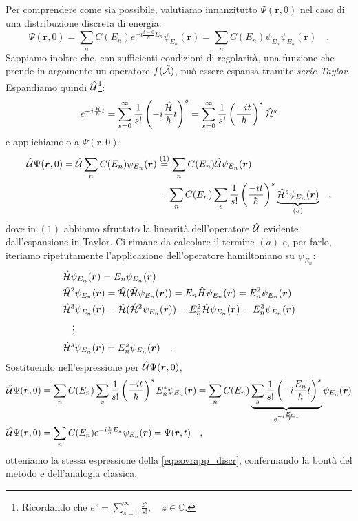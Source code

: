 Per comprendere come sia possibile, valutiamo innanzitutto $\Psi(\bm{r}, 0)$ nel caso di una distribuzione discreta di energia:
\[
    \Psi(\bm{r},0) = \sum_n C(E_n)e^{-i\frac{t = 0}{\hbar}E_n}\psi_{E_n}(\bm{r}) = \sum_n C(E_n)\psi_{E_n}\psi_{E_n}(\bm{r}) \quad.
\]
Sappiamo inoltre che, con sufficienti condizioni di regolarità, una funzione che prende in argomento un operatore $f(\hat{\mathcal{A}})$, può essere espansa tramite \emph{serie Taylor}. Espandiamo quindi $\hat{\mathcal{U}}$\footnote{Ricordando che $e^z = \sum_{s = 0}^{\infty} \frac{z^s}{s!}, \quad z \in \mathbb{C}$.}:
\[
    e^{-i\frac{\hat{\mathcal{H}}}{\hbar}t} = \sum_{s=0}^{\infty} \frac{1}{s!}\left(-i\frac{\hat{\mathcal{H}}}{\hbar}t\right)^s = \sum_{s=0}^{\infty} \frac{1}{s!}\left(\frac{-it}{\hbar}\right)^s \hat{\mathcal{H}}^s
\]
e applichiamolo a $\Psi(\bm{r},0)$:
\[
\begin{aligned}
    \hat{\mathcal{U}}\Psi(\bm{r},0) = \hat{\mathcal{U}}\sum_n C(E_n)\psi_{E_n}(\bm{r}) &\overset{(1)}{=} \sum_n C(E_n) \hat{\mathcal{U}} \psi_{E_n}(\bm{r}) \\
    &= \sum_n C(E_n) \sum_{s} \frac{1}{s!}\left(\frac{-it}{\hbar}\right)^s \underbrace{\hat{\mathcal{H}}^s \psi_{E_n}(\bm{r})}_{(a)} \quad,
\end{aligned}
\]
dove in $(1)$ abbiamo sfruttato la linearità dell'operatore $\hat{\mathcal{U}}$ evidente dall'espansione in Taylor. Ci rimane da calcolare il termine $(a)$ e, per farlo, iteriamo ripetutamente l'applicazione dell'operatore hamiltoniano su $\psi_{E_n}$:
\[
\begin{aligned}
    &\hat{\mathcal{H}}\psi_{E_n}(\bm{r}) = E_n\psi_{E_n}(\bm{r}) \\
    &\hat{\mathcal{H}}^2\psi_{E_n}(\bm{r}) = \hat{\mathcal{H}}(\hat{\mathcal{H}}\psi_{E_n}(\bm{r})) = E_n\hat{H}\psi_{E_n}(\bm{r}) = E_n^2\psi_{E_n}(\bm{r}) \\
    &\hat{\mathcal{H}}^3\psi_{E_n}(\bm{r}) = \hat{\mathcal{H}}(\hat{\mathcal{H}}^2\psi_{E_n}(\bm{r})) = E_n^2\hat{\mathcal{H}}\psi_{E_n}(\bm{r}) = E_n^3 \psi_{E_n}(\bm{r}) \\
    &  \quad \vdots \\
    & \hat{\mathcal{H}}^s \psi_{E_n}(\bm{r}) = E_n^s\psi_{E_n}(\bm{r}) \quad.
\end{aligned}
\]
Sostituendo nell'espressione per $\hat{\mathcal{U}}\Psi(\bm{r},0)$,
\[
\begin{aligned}
    \hat{\mathcal{U}}\Psi(\bm{r},0) &= \sum_n C(E_n) \sum_{s} \frac{1}{s!}\left(\frac{-it}{\hbar}\right)^s E_n^s\psi_{E_n}(\bm{r}) = \sum_n C(E_n) \underbrace{\sum_{s} \frac{1}{s!}\left(-i\frac{E_n}{\hbar}t\right)^s}_{e^{-i\frac{E_n}{\hbar}t}}\psi_{E_n}(\bm{r}) \\
    \hat{\mathcal{U}}\Psi(\bm{r},0) &= \sum_n C(E_n)e^{-i\frac{t}{\hbar}E_n}\psi_{E_n}(\bm{r}) = \Psi(\bm{r}, t)\quad,
\end{aligned}
\]
otteniamo la stessa espressione della \eqref{eq:sovrapp_discr}, confermando la bontà del metodo e dell'analogia classica. 

